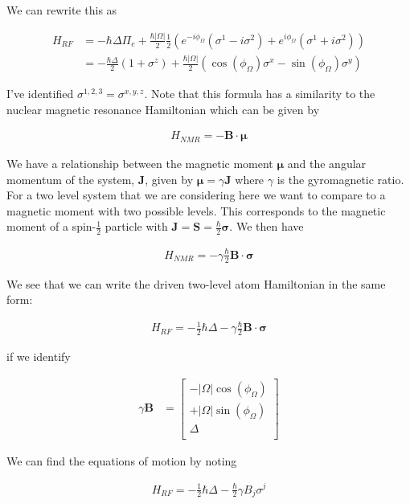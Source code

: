 \documentclass[12pt]{article}
\newcommand{\bv}[1]{\boldsymbol{#1}}
\begin{document}
We can rewrite this as

\begin{align}
H_{RF} &= -\hbar \Delta \Pi_e + \frac{\hbar|\Omega|}{2}\frac{1}{2}\left(e^{-i\phi_{\Omega}}(\sigma^1-i\sigma^2) + e^{i\phi_{\Omega}}(\sigma^1+i\sigma^2) \right)\\
&= -\frac{\hbar \Delta}{2} (1+\sigma^z) + \frac{\hbar|\Omega|}{2}\left(\cos(\phi_{\Omega})\sigma^x  -\sin(\phi_{\Omega})\sigma^y\right)
\end{align}

I've identified $\sigma^{1,2,3} = \sigma^{x,y,z}$. Note that this formula has a similarity to the nuclear magnetic resonance Hamiltonian which can be given by 

\begin{align}
H_{NMR} = -\bv{B}\cdot\bv{\mu}
\end{align}

We have a relationship between the magnetic moment $\bv{\mu}$ and the angular momentum of the system, $\bv{J}$, given by $\bv{\mu} = \gamma \bv{J}$ where $\gamma$ is the gyromagnetic ratio. For a two level system that we are considering here we want to compare to a magnetic moment with two possible levels. This corresponds to the magnetic moment of a spin-$\frac{1}{2}$ particle with $\bv{J} = \bv{S} = \frac{\hbar}{2} \bv{\sigma}$. We then have

\begin{align}
H_{NMR} = -\gamma\frac{\hbar}{2} \bv{B} \cdot \bv{\sigma}
\end{align}


We see that we can write the driven two-level atom Hamiltonian in the same form:

\begin{align}
H_{RF} = -\frac{1}{2} \hbar\Delta - \gamma\frac{\hbar}{2} \bv{B} \cdot \bv{\sigma}
\end{align}

if we identify

\begin{align}
\gamma\bv{B} &=
\begin{bmatrix}
-|\Omega|\cos(\phi_{\Omega})\\
+|\Omega|\sin(\phi_{\Omega})\\
\Delta\\
\end{bmatrix}
\end{align}

We can find the equations of motion by noting

\begin{align}
H_{RF} = -\frac{1}{2} \hbar \Delta - \frac{\hbar}{2} \gamma B_j \sigma^j
\end{align}
\end{document}
